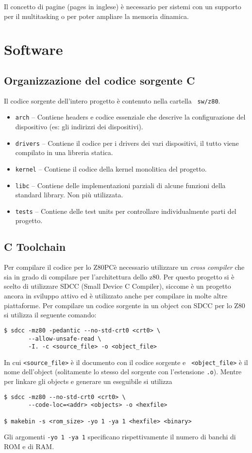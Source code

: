 \documentclass[a4paper, 11pt]{article}
\newcommand{\prj}{Z80\textmu PC\xspace}
\begin{document}
Il concetto di pagine (pages in inglese) \`e necessario per sistemi con un
supporto per il multitasking o per poter ampliare la memoria dinamica.

\break
\section{Software}
\subsection{Organizzazione del codice sorgente C}
Il codice sorgente dell'intero progetto \`e contenuto nella cartella {\tt
sw/z80}.
\begin{itemize}
    \item {\tt arch} -- Contiene headers e codice essenziale che descrive la
            configurazione del dispositivo (es: gli indirizzi dei dispositivi).
    \item {\tt drivers} -- Contiene il codice per i drivers dei vari 
            dispositivi, il tutto viene compilato in una libreria statica.
    \item {\tt kernel} -- Contiene il codice della kernel monolitica del progetto.
    \item {\tt libc} -- Contiene delle implementazioni parziali di alcune 
            funzioni della standard library. Non pi\`u utilizzata.
    \item {\tt tests} -- Contiene delle test units per controllare 
            individualmente parti del progetto.
\end{itemize}

\subsection{C Toolchain}
Per compilare il codice per lo \prj \`e necessario utilizzare un \emph{cross
compiler} che sia in grado di compilare per l'architettura dello z80. Per
questo progetto si \`e scelto di utilizzare SDCC (Small Device C Compiler),
siccome \`e un progetto ancora in sviluppo attivo ed \`e utilizzato anche per
compilare in molte altre piattaforme. Per compilare un codice sorgente in un
object con SDCC per lo Z80 si utilizza il seguente comando:
\begin{verbatim}
$ sdcc -mz80 -pedantic --no-std-crt0 <crt0> \
       --allow-unsafe-read \
       -I. -c <source_file> -o <object_file>
\end{verbatim}
In cui {\tt <source\_file>} \`e il documento con il codice sorgente e {\tt
<object\_file>} \`e il nome dell'object (solitamente lo stesso del sorgente
con l'estensione {\tt .o}). Mentre per linkare gli objects e generare un
eseguibile si utilizza
\begin{verbatim}
$ sdcc -mz80 --no-std-crt0 <crt0> \
       --code-loc=<addr> <objects> -o <hexfile>

$ makebin -s <rom_size> -yo 1 -ya 1 <hexfile> <binary>
\end{verbatim}
Gli argomenti {\tt -yo 1 -ya 1} specificano rispettivamente il numero di
banchi di ROM e di RAM. 
\end{document}
